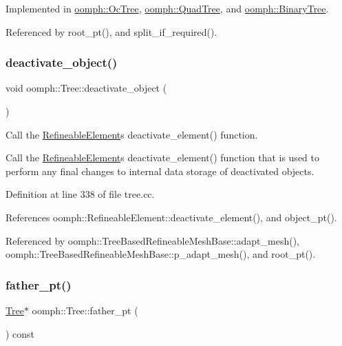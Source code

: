 Implemented in \hyperlink{classoomph_1_1OcTree_a2f894bab3cbde60d810de0ee43a9f023}{oomph\+::\+Oc\+Tree}, \hyperlink{classoomph_1_1QuadTree_aa05756df125b508ca55f30cf4c4a11e9}{oomph\+::\+Quad\+Tree}, and \hyperlink{classoomph_1_1BinaryTree_adeb5fdb3cc2b86827622586c42afba37}{oomph\+::\+Binary\+Tree}.



Referenced by root\+\_\+pt(), and split\+\_\+if\+\_\+required().

\mbox{\label{classoomph_1_1Tree_aea17489589a1872db51f2b142da4c1fb}} 
\subsubsection{\texorpdfstring{deactivate\+\_\+object()}{deactivate\_object()}}
{\footnotesize\ttfamily void oomph\+::\+Tree\+::deactivate\+\_\+object (\begin{DoxyParamCaption}{ }\end{DoxyParamCaption})}



Call the \hyperlink{classoomph_1_1RefineableElement}{Refineable\+Element}\textquotesingle{}s deactivate\+\_\+element() function. 

Call the \hyperlink{classoomph_1_1RefineableElement}{Refineable\+Element}\textquotesingle{}s deactivate\+\_\+element() function that is used to perform any final changes to internal data storage of deactivated objects. 

Definition at line 338 of file tree.\+cc.



References oomph\+::\+Refineable\+Element\+::deactivate\+\_\+element(), and object\+\_\+pt().



Referenced by oomph\+::\+Tree\+Based\+Refineable\+Mesh\+Base\+::adapt\+\_\+mesh(), oomph\+::\+Tree\+Based\+Refineable\+Mesh\+Base\+::p\+\_\+adapt\+\_\+mesh(), and root\+\_\+pt().

\mbox{\label{classoomph_1_1Tree_a5f8444ddeda272b70669b8bbe929708a}} 
\subsubsection{\texorpdfstring{father\+\_\+pt()}{father\_pt()}}
{\footnotesize\ttfamily \hyperlink{classoomph_1_1Tree}{Tree}$\ast$ oomph\+::\+Tree\+::father\+\_\+pt (\begin{DoxyParamCaption}{ }\end{DoxyParamCaption}) const\hspace{0.3cm}{\ttfamily [inline]}}




